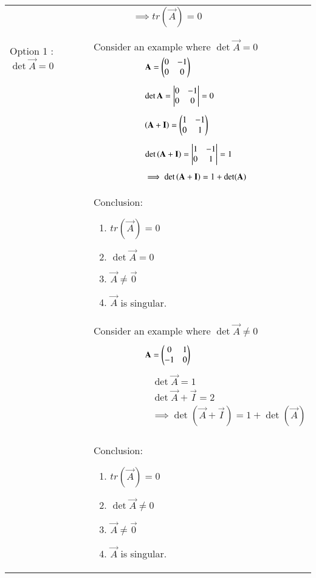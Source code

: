 \documentclass[journal,12pt]{IEEEtran}
\begin{document}
\begin{longtable}{|p{5cm}|p{13cm}|}
    &$\qquad\qquad\implies\boxed{ tr(\vec{A})=0}$\\
    &\\
    \hline
  	\multirow{3}{*}{Option 1 : $\det\vec{A}=0$ } 
	& \\
	& Consider an example where $\det{\vec{A}}=0$\\
	& $\qquad\qquad\qquad\mathbf{A}=\begin{pmatrix}0&-1\\0&0\end{pmatrix}$\\
	&\\
	& $\qquad\qquad\qquad\det{\mathbf{A}} = \begin{vmatrix}0&-1\\0&0\end{vmatrix} = 0$\\
	&\\
	& $\qquad\qquad\qquad\left(\mathbf{A}+\mathbf{I}\right)=\begin{pmatrix}1&-1\\0&1\end{pmatrix}$\\
	&\\
	& $\qquad\qquad\qquad\det\left(\mathbf{A}+\mathbf{I}\right)=\begin{vmatrix}1&-1\\0&1\end{vmatrix}=1$\\
	&\\
	& $\qquad\qquad\qquad\implies\det\left(\mathbf{A}+\mathbf{I}\right)=1+\det(\mathbf{A
	})$\\
	& Conclusion: {\begin{enumerate}
	\item $tr(\vec{A})=0$
	\item $\det{\vec{A}}= 0$
	\item $\vec{A} \neq \vec{0}$
	\item $\vec{A}$ is  singular.\end{enumerate}}\\
	& Consider an example where $\det{\vec{A}}\neq 0$\\
	&\\
	& $\qquad\qquad\qquad\mathbf{A}=\begin{pmatrix}0&1\\-1&0\end{pmatrix}$\\
	&\\
	& $\qquad\qquad\qquad\det{\vec{A}}= 1$\\
	& $\qquad\qquad\qquad\det{\vec{A}+\vec{I}}= 2$\\
	& $\qquad\qquad\qquad\implies \det(\vec{A}+\vec{I})= 1+\det(\vec{A})$\\
	&\\
	& Conclusion: {\begin{enumerate}
	\item $tr(\vec{A})=0$
	\item $\det{\vec{A}}\neq 0$
	\item $\vec{A} \neq \vec{0}$
	\item $\vec{A}$ is  singular.\end{enumerate}}\\
	

\end{longtable}
\end{document}
